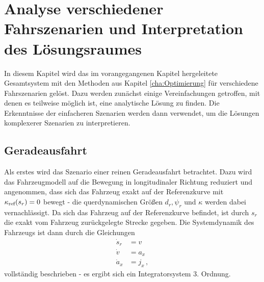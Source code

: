 \chapter{Analyse verschiedener Fahrszenarien und Interpretation des Lösungsraumes}\label{cha:Ergebnisse}
In diesem Kapitel wird das im vorangegangenen Kapitel hergeleitete Gesamtsystem mit den Methoden aus Kapitel \ref{cha:Optimierung} für verschiedene Fahrszenarien gelöst. Dazu werden zunächst einige Vereinfachungen getroffen, mit denen es teilweise möglich ist, eine analytische Lösung zu finden. Die Erkenntnisse der einfacheren Szenarien werden dann verwendet, um die Lösungen komplexerer Szenarien zu interpretieren. 
\section{Geradeausfahrt}
Als erstes wird das Szenario einer reinen Geradeausfahrt betrachtet. Dazu wird das Fahrzeugmodell auf die Bewegung in longitudinaler Richtung reduziert und angenommen, dass sich das Fahrzeug exakt auf der Referenzkurve mit $\kappa_{\textrm{ref}}(s_r) = 0$ bewegt - die querdynamischen Größen $d_r, \psi_r$ und $\kappa$ werden dabei vernachlässigt. Da sich das Fahrzeug auf der Referenzkurve befindet, ist durch $s_r$ die exakt vom Fahrzeug zurückgelegte Strecke gegeben. Die Systemdynamik des Fahrzeugs ist dann durch die Gleichungen 
\begin{align}
\dot{s}_r &= v \\
\dot{v} &= a_x \\
\dot{a}_x &= j_x \,,
\end{align}
vollständig beschrieben - es ergibt sich ein Integratorsystem 3. Ordnung. 
